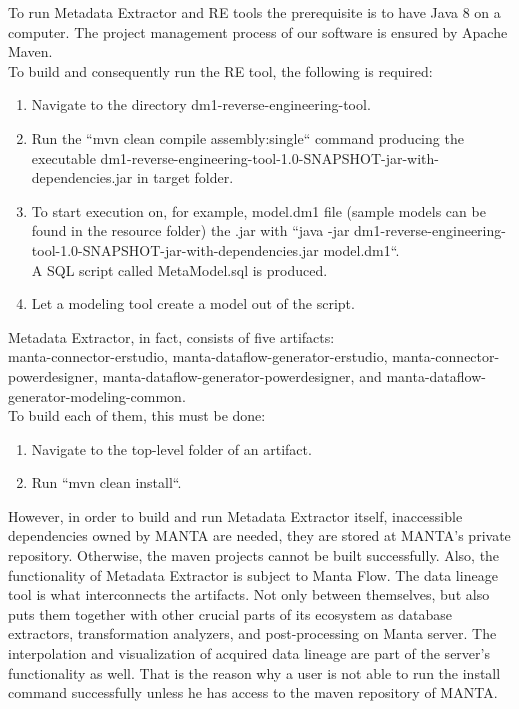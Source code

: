 \documentclass[12pt,a4paper]{report}
\begin{document}
To run Metadata Extractor and RE tools the prerequisite is to have Java 8 on a computer. The project management process of our software is ensured by Apache Maven. \\

To build and consequently run the RE tool, the following is required:
\begin{enumerate}
	\item Navigate to the directory dm1-reverse-engineering-tool.
	\item Run the ``mvn clean compile assembly:single`` command producing the executable dm1-reverse-engineering-tool-1.0-SNAPSHOT-jar-with-dependencies.jar in target folder.
	\item To start execution on, for example, model.dm1 file (sample models can be found in the resource folder) the .jar with ``java -jar dm1-reverse-engineering-tool-1.0-SNAPSHOT-jar-with-dependencies.jar model.dm1``.\\ A SQL script called MetaModel.sql is produced.
	\item Let a modeling tool create a model out of the script.
\end{enumerate}

Metadata Extractor, in fact, consists of five artifacts: \\manta-connector-erstudio, manta-dataflow-generator-erstudio, manta-connector-powerdesigner, manta-dataflow-generator-powerdesigner, and manta-dataflow-generator-modeling-common. \\
To build each of them, this must be done:
\begin{enumerate}
	\item Navigate to the top-level folder of an artifact.
	\item Run ``mvn clean install``.
\end{enumerate}

However, in order to build and run Metadata Extractor itself, inaccessible dependencies owned by MANTA are needed, they are stored at MANTA's private repository. Otherwise, the maven projects cannot be built successfully.
Also, the functionality of Metadata Extractor is subject to Manta Flow. The data lineage tool is what interconnects the artifacts. 
Not only between themselves, but also puts them together with other crucial parts of its ecosystem as database extractors, transformation analyzers, and post-processing on Manta server. 
The interpolation and visualization of acquired data lineage are part of the server's functionality as well.
That is the reason why a user is not able to run the install command successfully unless he has access to the maven repository of MANTA. \\
\end{document}
